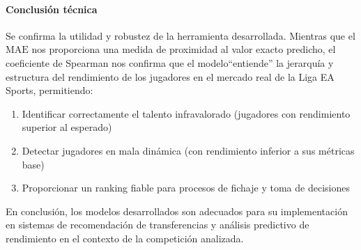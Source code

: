 \paragraph{Conclusión técnica}

Se confirma la utilidad y robustez de la herramienta
desarrollada. Mientras que el $\mathrm{MAE}$ nos proporciona una 
medida de proximidad al valor exacto predicho, el coeficiente de 
Spearman nos confirma que el modelo``entiende'' la 
jerarquía y estructura del rendimiento de los jugadores en el 
mercado real de la Liga EA Sports, permitiendo:

\begin{enumerate}
  \item Identificar correctamente el talento infravalorado
        (jugadores con rendimiento superior al esperado)
  
  \item Detectar jugadores en mala dinámica (con 
        rendimiento inferior a sus métricas base)
  
  \item Proporcionar un ranking fiable para procesos de 
        fichaje y toma de decisiones
\end{enumerate}

En conclusión, los modelos desarrollados son adecuados para su 
implementación en sistemas de recomendación de transferencias y 
análisis predictivo de rendimiento en el contexto de la 
competición analizada.

